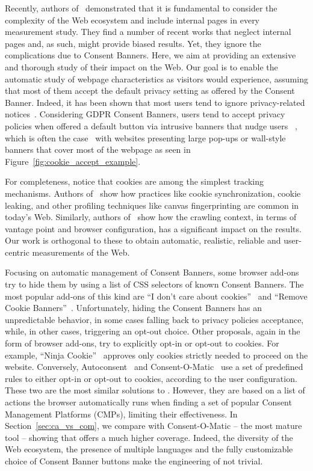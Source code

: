 Recently, authors of~\cite{aqeel2020on} demonstrated that it is fundamental to consider the complexity of the Web ecosystem and include internal pages in every measurement study. They find a number of recent works that neglect internal pages and, as such, might provide biased results. Yet, they ignore the complications due to Consent Banners. Here, we aim at providing an extensive and thorough study of their impact on the Web. Our goal is to enable the automatic study of webpage characteristics as visitors would experience, assuming that most of them accept the default privacy setting as offered by the Consent Banner. Indeed, it has been shown that most users tend to ignore privacy-related notices~\cite{vila2003we, grossklags2007empirical, coventry2016personality}. Considering GDPR Consent Banners, users tend to accept privacy policies when offered a default button via intrusive banners that nudge users ~\cite{CookieBenchmarkStudy,bauer2021you}, which is often the case~\cite{hausner2021dark} with websites presenting large pop-ups or wall-style banners that cover most of the webpage as seen in Figure~\ref{fig:cookie_accept_example}. 

For completeness, notice that cookies are among the simplest tracking mechanisms. Authors of~\cite{papadogiannakis2021} show how practices like cookie synchronization, cookie leaking, and other profiling techniques like canvas fingerprinting are common in today's Web. Similarly, authors of~\cite{jueckstock2021towards} show how the crawling context, in terms of vantage point and browser configuration, has a significant impact on the results. Our work is orthogonal to these to obtain automatic, realistic, reliable and user-centric measurements of the Web.

Focusing on automatic management of Consent Banners, some browser add-ons try to hide them by using a list of CSS selectors of known Consent Banners. The most popular add-ons of this kind are ``I don't care about cookies''~\cite{idontcare} and ``Remove Cookie Banners''~\cite{remove}. Unfortunately, hiding the Consent Banners has an unpredictable behavior, in some cases falling back to privacy policies acceptance, while, in other cases, triggering an opt-out choice. Other proposals, again in the form of browser add-ons, try to explicitly opt-in or opt-out to cookies. For example, ``Ninja Cookie''~\cite{ninja} approves only cookies strictly needed to proceed on the website. Conversely, Autoconsent~\cite{autoconsent} and Consent-O-Matic~\cite{consentomatic} use a set of predefined rules to either opt-in or opt-out to cookies, according to the user configuration. These two are the most similar solutions to \TOOL. However, they are based on a list of actions the browser automatically runs when finding a set of popular Consent Management Platforms (CMPs), limiting their effectiveness. In Section~\ref{sec:ca_vs_com}, we compare \TOOL with Consent-O-Matic -- the most mature tool -- showing that \TOOL offers a much higher coverage. Indeed, the diversity of the Web ecosystem, the presence of multiple languages and the fully customizable choice of Consent Banner buttons make the engineering of \TOOL not trivial.

